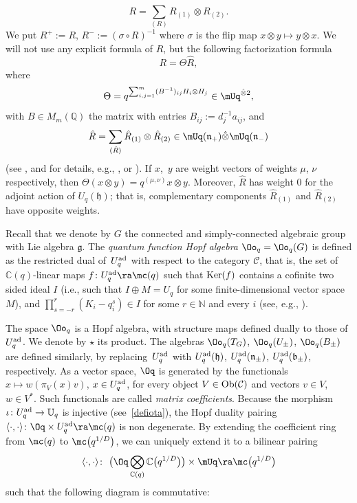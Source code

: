 \begin{equation}\label{Rcat}
R=\sum_{(R)}R_{(1)}\otimes R_{(2)}.
\end{equation}
We put $R^+:=R$, $R^- := (\sigma\circ R)^{-1}$ where $\sigma$ is the flip map $x\otimes y \mapsto y\otimes x$. We will not use any explicit formula of $R$, but the following factorization formula
\begin{equation}\label{Rmatfact}
R=\Theta \hat{R},
\end{equation}
where
\[\Theta = q^{\sum_{i,j=1}^m (B^{-1})_{ij} H_i\otimes H_j} \in \mUq^{\hat{\otimes} 2},\]
with $B\in M_m(\mathbb{Q})$ the matrix with entries $B_{ij}:=d_j^{-1}a_{ij}$, and
\[\hat{R}=\sum_{(\hat{R})} \hat{R}_{(1)} \otimes \hat{R}_{(2)}\in \mUq(\mathfrak{n}_+)\hat{\otimes} \mUq(\mathfrak{n}_-)\]
(see \cite[Section 3.2]{BR}, and for details, e.g., \cite[Theorem 8.3.9]{CP}, or \cite[Theorem 3.108]{VY}). If $x$,~$y$ are weight vectors of weights $\mu$, $\nu$ respectively, then $\Theta(x\otimes y) = q^{(\mu,\nu)} x\otimes y$. Moreover, $\hat{R}$ has weight $0$ for the adjoint action of $U_q(\mathfrak{h})$; that is, complementary components $\hat{R}_{(1)}$ and $\hat{R}_{(2)}$ have opposite weights.


Recall that we denote by $G$ the connected and simply-connected algebraic group with Lie algebra $\mathfrak{g}$. The {\it quantum function Hopf algebra} $\Oo_q=\Oo_q(G)$ is defined as the restricted dual of~$U_q^{\rm ad}$ with respect to the category $\mathcal{C}$, that is, the set of ${\mathbb C}(q)$-linear maps $f\colon U_q^{\rm ad}\ra \mc(q)$ such that ${\rm Ker}(f)$ contains a cofinite two sided ideal $I$ (i.e., such that $I\oplus M =U_q$ for some finite-dimensional vector space $M$), and $ \prod_{s=-r}^r (K_i - q_i^s) \in I$ for some $r\in \mathbb{N}$ and every $i$ (see, e.g., \cite[Chapter I.7]{BG}).

The space $\Oo_q$ is a Hopf algebra, with structure maps defined dually to those of $U_q^{\rm ad}$. We denote by $\star$ its product. The algebras $\Oo_q(T_G)$, $\Oo_q(U_\pm)$, $\Oo_q(B_\pm)$ are defined similarly, by replacing~$U_q^{\rm ad}$ with $U_q^{\rm ad}(\mathfrak{h})$, $U_q^{\rm ad}(\mathfrak{n}_\pm)$, $U_q^{\rm ad}(\mathfrak{b}_\pm)$, respectively. As a vector space, $\Oq$ is generated by the functionals $x\mapsto w(\pi_V(x)v)$, $x\in U_q^{\rm ad}$, for every object $V\in {\rm Ob}(\mathcal{C})$ and vectors $v\in V$, $w\in V^*$. Such functionals are called {\it matrix coefficients}. Because the morphism $\iota\colon U_q^{\rm ad}\to \mathbb{U}_q$ is injective (see~\eqref{defiota}), the Hopf duality pairing $\langle\cdot,\cdot\rangle \colon \Oq \times U_q^{\rm ad} \ra \mc(q)$ is non degenerate. By extending the coefficient ring from $\mc(q)$ to $\mc\big(q^{1/D}\big)$, we can uniquely extend it to a bilinear pairing
\[\langle\cdot,\cdot\rangle\colon\ \big(\Oq \bigotimes_{{\mathbb C}(q)} {\mathbb C}\big(q^{1/D}\big)\big)\times \mUq \ra \mc\big(q^{1/D}\big)\]
such that the following diagram is commutative:


